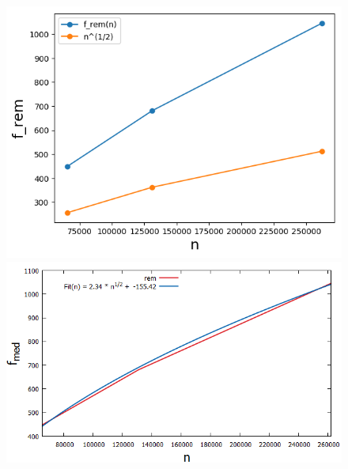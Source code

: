 \begin{figure}[H]
	\hspace*{-.8cm}
    \begin{minipage}[t]{.30\textwidth}
        \centering
		\includegraphics[width=\textwidth]{pictures/med_algo_theo28_rem}
    \end{minipage}
    \hspace*{.3cm}
    \begin{minipage}[t]{.30\textwidth}
        \centering
        \includegraphics[width=1.25\textwidth]{pictures/med_algo_theo28_fit_rem}
    \end{minipage}
    \hspace*{1.2cm}
    \begin{minipage}[t]{.30\textwidth}
        \centering

\end{minipage}
\end{figure}
